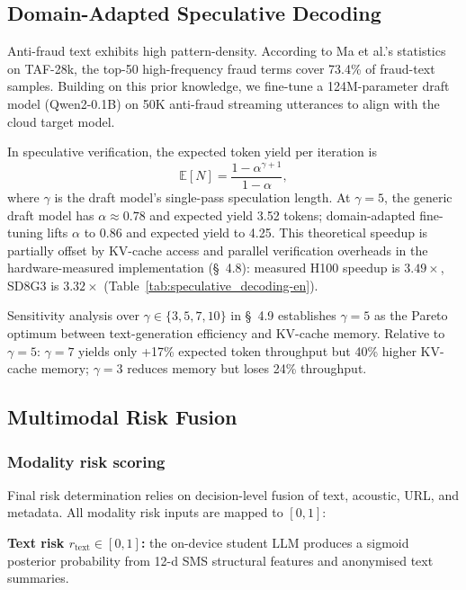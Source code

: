 \documentclass[11pt, a4paper]{article}
\begin{document}
\subsection{Domain-Adapted Speculative Decoding}

Anti-fraud text exhibits high pattern-density. According to Ma et al.'s statistics on TAF-28k, the top-50 high-frequency fraud terms cover 73.4\% of fraud-text samples. Building on this prior knowledge, we fine-tune a 124M-parameter draft model (Qwen2-0.1B) on 50K anti-fraud streaming utterances to align with the cloud target model.

In speculative verification, the expected token yield per iteration is
\begin{equation}
\mathbb{E}[N] = \frac{1-\alpha^{\gamma+1}}{1-\alpha},
\end{equation}
where $\gamma$ is the draft model's single-pass speculation length. At $\gamma = 5$, the generic draft model has $\alpha\approx 0.78$ and expected yield 3.52 tokens; domain-adapted fine-tuning lifts $\alpha$ to 0.86 and expected yield to 4.25. This theoretical speedup is partially offset by KV-cache access and parallel verification overheads in the hardware-measured implementation (\S~4.8): measured H100 speedup is $3.49\times$, SD8G3 is $3.32\times$ (Table~\ref{tab:speculative_decoding-en}).

Sensitivity analysis over $\gamma\in\{3,5,7,10\}$ in \S~4.9 establishes $\gamma = 5$ as the Pareto optimum between text-generation efficiency and KV-cache memory. Relative to $\gamma = 5$: $\gamma = 7$ yields only +17\% expected token throughput but 40\% higher KV-cache memory; $\gamma = 3$ reduces memory but loses 24\% throughput.

\subsection{Multimodal Risk Fusion}

\subsubsection{Modality risk scoring}

Final risk determination relies on decision-level fusion of text, acoustic, URL, and metadata. All modality risk inputs are mapped to $[0, 1]$:

\textbf{Text risk $r_{\mathrm{text}}\in[0,1]$:} the on-device student LLM produces a sigmoid posterior probability from 12-d SMS structural features and anonymised text summaries.
\end{document}
